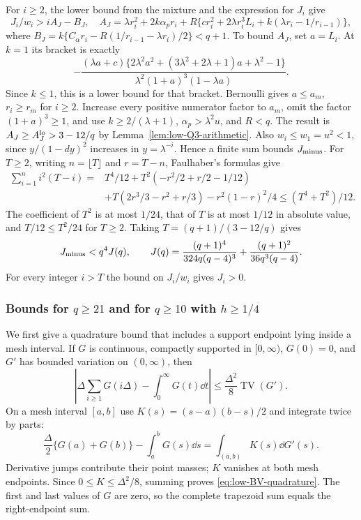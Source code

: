 For $i\ge2$, the lower bound from the mixture and the expression
for $J_i$ give
\[
 J_i/w_i>iA_J-B_J,
 \quad A_J=\lambda r_i^2+2k\alpha_pr_i
 +R\{cr_i^2+2\lambda r_i^3L_i+k(\lambda r_i-1/r_{i-1})\},
\]
where $B_J=k\{C_\alpha r_i-R(1/r_{i-1}-\lambda r_i)/2\}<q+1$.
To bound $A_J$, set $a=L_i$.  At $k=1$ its bracket is exactly
\[
 -\frac{(\lambda a+c)
       \{2\lambda^2a^2+(3\lambda^2+2\lambda+1)a+\lambda^2-1\}}
       {\lambda^2(1+a)^3(1-\lambda a)}.
\]
Since $k\le1$, this is a lower bound for that bracket.
Bernoulli gives $a\le a_m$, $r_i\ge r_m$ for $i\ge2$.
Increase every positive numerator factor to $a_m$, omit the factor
$(1+a)^3\ge1$, and use $k\ge2/(\lambda+1)$,
$\alpha_p>\lambda^2u$, and $R<q$.  The result is
$A_J\ge A_J^{\rm lo}>3-12/q$ by Lemma~\ref{lem:low-Q3-arithmetic}.
Also $w_i\le w_1=u^2<1$, since
$y/(1-dy)^2$ increases in $y=\lambda^{-i}$.
Hence a finite sum bounds $J_{\rm minus}$. For $T\ge2$, writing
$n=\lfloor T\rfloor$ and $r=T-n$,
Faulhaber's formulas give
\begin{align*}
 \sum_{i=1}^n i^2(T-i)
 ={}&T^4/12+T^2(-r^2/2+r/2-1/12)\\
 &+T(2r^3/3-r^2+r/3)-r^2(1-r)^2/4
 \le(T^4+T^2)/12.
\end{align*}
The coefficient of $T^2$ is at most $1/24$, that of $T$ is at most
$1/12$ in absolute value, and $T/12\le T^2/24$ for $T\ge2$.
Taking $T=(q+1)/(3-12/q)$ gives
\begin{equation}\label{eq:low-Q3-square-cost}
 J_{\rm minus}<q^4J(q),\qquad
 J(q)=\frac{(q+1)^4}{324q(q-4)^3}
                       +\frac{(q+1)^2}{36q^3(q-4)}.
\end{equation}
For every integer $i>T$ the bound on $J_i/w_i$ gives $J_i>0$.

\subsubsection{Bounds for \texorpdfstring{$q\ge21$ and for $q\ge10$ with $h\ge1/4$}{q >= 21 and for q >= 10 with h >= 1/4}}
We first give a quadrature bound that includes a support endpoint
lying inside a mesh interval.  If $G$ is continuous, compactly
supported in $[0,\infty)$, $G(0)=0$, and $G'$ has bounded variation
on $(0,\infty)$, then
\begin{equation}\label{eq:low-BV-quadrature}
 \left|\Delta\sum_{i\ge1}G(i\Delta)-\int_0^\infty G(t)\dd t\right|
 \le\frac{\Delta^2}{8}\operatorname{TV}(G').
\end{equation}
On a mesh interval $[a,b]$ use $K(s)=(s-a)(b-s)/2$ and integrate
twice by parts:
\[
 \frac{\Delta}{2}\{G(a)+G(b)\}-\int_a^bG(s)\dd s
                  =\int_{(a,b)}K(s)\dd G'(s).
\]
Derivative jumps contribute their point masses; $K$ vanishes at
both mesh endpoints.  Since $0\le K\le\Delta^2/8$, summing proves
\eqref{eq:low-BV-quadrature}.  The first and last values of $G$ are
zero, so the complete trapezoid sum equals the right-endpoint sum.

